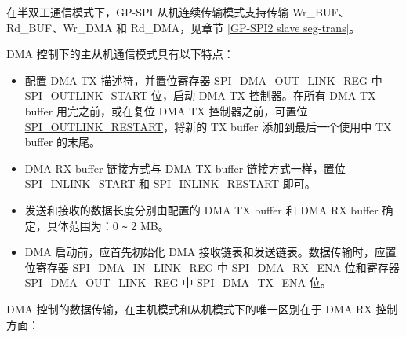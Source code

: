 \documentclass[main\_\_CN.tex]{subfiles}
\begin{document}
在半双工通信模式下，GP-SPI 从机连续传输模式支持传输 Wr\_BUF、Rd\_BUF、Wr\_DMA 和 Rd\_DMA，见章节 \ref{GP-SPI2 slave seg-trans}。

DMA 控制下的主从机通信模式具有以下特点：

\begin{itemize}
    \item 配置 DMA TX 描述符，并置位寄存器 \hyperref[regdesc:SPIDMAOUTLINKREG]{SPI\_DMA\_OUT\_LINK\_REG} 中 \hyperref[fielddesc:SPIOUTLINKSTART]{SPI\_OUTLINK\_START} 位，启动 DMA TX 控制器。在所有 DMA TX buffer 用完之前，或在复位 DMA TX 控制器之前，可置位 \hyperref[fielddesc:SPIOUTLINKRESTART]{SPI\_OUTLINK\_RESTART}，将新的 TX buffer 添加到最后一个使用中 TX buffer 的末尾。

    \item DMA RX buffer 链接方式与 DMA TX buffer 链接方式一样，置位 \hyperref[fielddesc:SPIINLINKSTART]{SPI\_INLINK\_START} 和 \hyperref[fielddesc:SPIINLINKRESTART]{SPI\_INLINK\_RESTART} 即可。

    \item 发送和接收的数据长度分别由配置的 DMA TX buffer 和 DMA RX buffer 确定，具体范围为：0 \verb+~+ 2 MB。

    \item DMA 启动前，应首先初始化 DMA 接收链表和发送链表。数据传输时，应置位寄存器  \hyperref[regdesc:SPIDMAINLINKREG]{SPI\_DMA\_IN\_LINK\_REG} 中 \hyperref[fielddesc:SPIDMARXENA]{SPI\_DMA\_RX\_ENA} 位和寄存器 \hyperref[regdesc:SPIDMAOUTLINKREG]{SPI\_DMA\_OUT\_LINK\_REG} 中 \hyperref[fielddesc:SPIDMATXENA]{SPI\_DMA\_TX\_ENA} 位。

\end{itemize}

DMA 控制的数据传输，在主机模式和从机模式下的唯一区别在于 DMA RX 控制方面：
\end{document}
